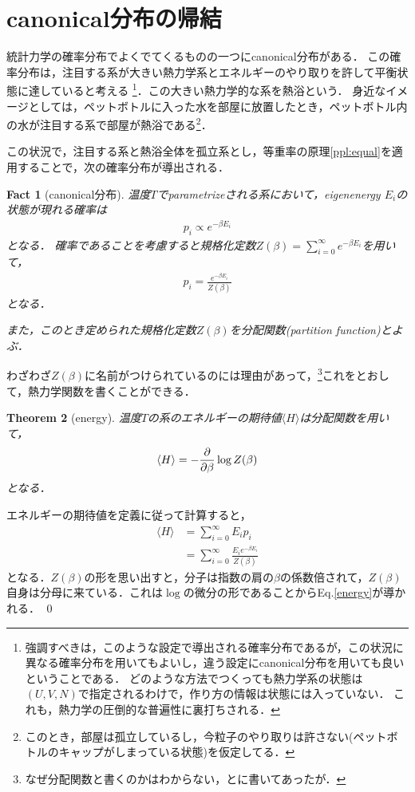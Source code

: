 \documentclass[dvipdfmx, a4paper]{jsarticle}
\makeatletter
\theoremstyle{break}
\newtheorem{thm}{Theorem}[section]
\newtheorem{fact}[thm]{Fact}
\newenvironment{pr}[1][\proofnam]{\par
\topsep6\p@\@plus6\p@ \trivlist
\item[\hskip\labelsep{\itshape #1}\@addpunct{\bfseries}]\ignorespaces
}{%
\endtrivlist
}
\newcommand{\proofnam}{\underline{Derivation.}}
\numberwithin{equation}{section}
\makeatother
\begin{document}
	\section{canonical分布の帰結}\label{sec:fact}
	統計力学の確率分布でよくでてくるものの一つにcanonical分布がある．
	この確率分布は，注目する系が大きい熱力学系とエネルギーのやり取りを許して平衡状態に達していると考える
	\footnote{
			強調すべきは，このような設定で導出される確率分布であるが，この状況に異なる確率分布を用いてもよいし，違う設定にcanonical分布を用いても良いということである．
			どのような方法でつくっても熱力学系の状態は$(U, V, N)$で指定されるわけで，作り方の情報は状態には入っていない．
			これも，熱力学の圧倒的な普遍性に裏打ちされる．
	}．この大きい熱力学的な系を熱浴という．
	身近なイメージとしては，ペットボトルに入った水を部屋に放置したとき，ペットボトル内の水が注目する系で部屋が熱浴である\footnote{このとき，部屋は孤立しているし，今粒子のやり取りは許さない(ペットボトルのキャップがしまっている状態)を仮定してる．}．
	
	この状況で，注目する系と熱浴全体を孤立系とし，等重率の原理\ref{ppl:equal}を適用することで，次の確率分布が導出される．

	\begin{fact}[canonical分布]\label{fact:canonical_dist}
			温度$T$でparametrizeされる系において，eigenenergy $E_i$の状態が現れる確率は
			\begin{align}
					p_i \propto e^{-\beta E_i} \label{boltzmann_factor}
			\end{align}
			となる．
			確率であることを考慮すると規格化定数$Z(\beta) = \sum_{i = 0}^{\infty} e^{-\beta E_i}$を用いて，
			\begin{align}
					p_i = \frac{e^{-\beta E_i}}{Z(\beta)}
			\end{align}
			となる．

			また，このとき定められた規格化定数$Z(\beta)$を分配関数(partition function)とよぶ．
	\end{fact}

	わざわざ$Z(\beta)$に名前がつけられているのには理由があって，\footnote{なぜ分配関数と書くのかはわからない，と\cite{Tasaki_statmech}に書いてあったが．}これをとおして，熱力学関数を書くことができる．
	\begin{thm}[energy]
			温度$T$の系のエネルギーの期待値$\langle H \rangle$は分配関数を用いて，
			\begin{align}
					\langle H \rangle = - \pdv{}{\beta} \log Z(\beta) \label{energy}
			\end{align}
			となる．
	\end{thm}
	\begin{pr}
			エネルギーの期待値を定義に従って計算すると，
			\begin{align}
					\langle H \rangle
					&= \sum _{i=0}^{\infty} E_i p_i\\
					&= \sum_{i=0}^{\infty} \frac{E_ie^{-\beta E_i}}{Z(\beta)}
			\end{align}
			となる．$Z(\beta)$の形を思い出すと，分子は指数の肩の$\beta$の係数倍されて，$Z(\beta)$自身は分母に来ている．これは$\log$の微分の形であることからEq.\eqref{energy}が導かれる． \qed
	\end{pr}
\end{document}
